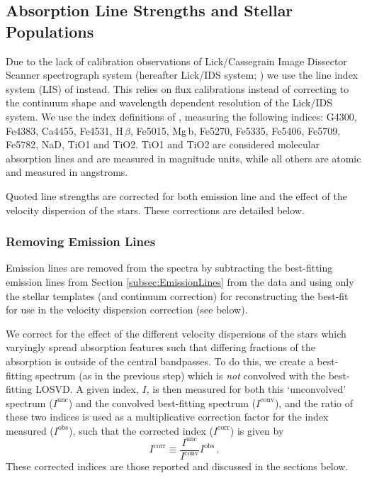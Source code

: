 \documentclass[fleqn,usenatbib,useAMS]{mnras}
\begin{document}
		

	\subsection{Absorption Line Strengths and Stellar Populations}
		\label{subsec:absorption}
		Due to the lack of calibration observations of Lick/Cassegrain Image Dissector Scanner spectrograph system (hereafter Lick/IDS system; \citealt{Faber1985, Worthey1994}) we use the line index system (LIS) of \citet{Vazdekis2010} instead. This relies on flux calibrations instead of correcting to the continuum shape and wavelength dependent resolution of the Lick/IDS system. We use the index definitions of \citet{Trager1998}, measuring the following indices: G4300, Fe4383, Ca4455, Fe4531, H\,$\beta$, Fe5015, Mg\,b, Fe5270, Fe5335, Fe5406, Fe5709, Fe5782, NaD, TiO1 and TiO2. TiO1 and TiO2 are considered molecular absorption lines and are measured in magnitude units, while all others are atomic and measured in angstroms. 

		Quoted line strengths are corrected for both emission line and the effect of the velocity dispersion of the stars. These corrections are detailed below.

		\subsubsection{Removing Emission Lines}
			Emission lines are removed from the spectra by subtracting the best-fitting emission lines from Section \ref{subsec:EmissionLines} from the data and using only the stellar templates (and continuum correction) for reconstructing the best-fit for use in the velocity dispersion correction (see below).

			We correct for the effect of the different velocity dispersions of the stars which varyingly spread absorption features such that differing fractions of the absorption is outside of the central bandpasses. To do this, we create a best-fitting spectrum (as in the previous step) which is \textit{not} convolved with the best-fitting LOSVD. A given index, $I$, is then measured for both this `unconvolved' spectrum ($I^\text{unc}$) and the convolved best-fitting spectrum ($I^\text{conv}$), and the ratio of these two indices is used as a multiplicative correction factor for the index measured ($I^\text{obs}$), such that the corrected index ($I^\text{corr}$) is given by
			\begin{equation}
				I^\text{corr} \equiv \frac{I^\text{unc}}{I^\text{conv}} I^\text{obs} \, .
			\end{equation}
			These corrected indices are those reported and discussed in the sections below.
\end{document}

